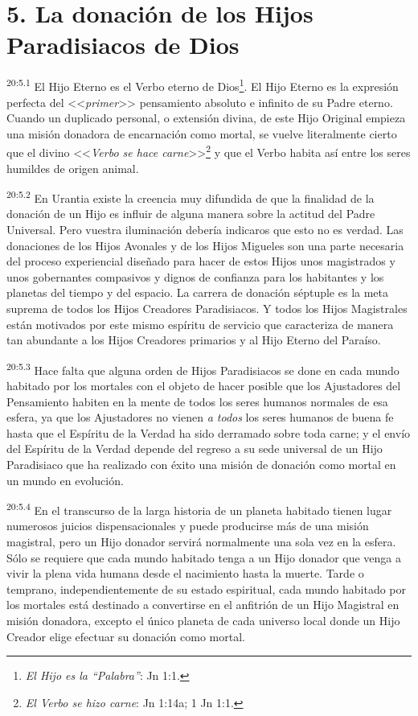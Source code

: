 \section*{5. La donación de los Hijos Paradisiacos de Dios}
\par
\textsuperscript{20:5.1} El Hijo Eterno es el Verbo eterno de Dios\footnote{\textit{El Hijo es la ``Palabra''}: Jn 1:1.}. El Hijo Eterno es la expresión perfecta del <<\textit{primer}>> pensamiento absoluto e infinito de su Padre eterno. Cuando un duplicado personal, o extensión divina, de este Hijo Original empieza una misión donadora de encarnación como mortal, se vuelve literalmente cierto que el divino <<\textit{Verbo se hace carne}>>\footnote{\textit{El Verbo se hizo carne}: Jn 1:14a; 1 Jn 1:1.} y que el Verbo habita así entre los seres humildes de origen animal.

\par
\textsuperscript{20:5.2} En Urantia existe la creencia muy difundida de que la finalidad de la donación de un Hijo es influir de alguna manera sobre la actitud del Padre Universal. Pero vuestra iluminación debería indicaros que esto no es verdad. Las donaciones de los Hijos Avonales y de los Hijos Migueles son una parte necesaria del proceso experiencial diseñado para hacer de estos Hijos unos magistrados y unos gobernantes compasivos y dignos de confianza para los habitantes y los planetas del tiempo y del espacio. La carrera de donación séptuple es la meta suprema de todos los Hijos Creadores Paradisiacos. Y todos los Hijos Magistrales están motivados por este mismo espíritu de servicio que caracteriza de manera tan abundante a los Hijos Creadores primarios y al Hijo Eterno del Paraíso.

\par
\textsuperscript{20:5.3} Hace falta que alguna orden de Hijos Paradisiacos se done en cada mundo habitado por los mortales con el objeto de hacer posible que los Ajustadores del Pensamiento habiten en la mente de todos los seres humanos normales de esa esfera, ya que los Ajustadores no vienen \textit{a todos} los seres humanos de buena fe hasta que el Espíritu de la Verdad ha sido derramado sobre toda carne; y el envío del Espíritu de la Verdad depende del regreso a su sede universal de un Hijo Paradisiaco que ha realizado con éxito una misión de donación como mortal en un mundo en evolución.

\par
\textsuperscript{20:5.4} En el transcurso de la larga historia de un planeta habitado tienen lugar numerosos juicios dispensacionales y puede producirse más de una misión magistral, pero un Hijo donador servirá normalmente una sola vez en la esfera. Sólo se requiere que cada mundo habitado tenga a un Hijo donador que venga a vivir la plena vida humana desde el nacimiento hasta la muerte. Tarde o temprano, independientemente de su estado espiritual, cada mundo habitado por los mortales está destinado a convertirse en el anfitrión de un Hijo Magistral en misión donadora, excepto el único planeta de cada universo local donde un Hijo Creador elige efectuar su donación como mortal.

